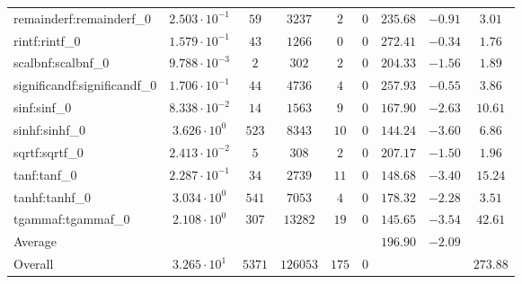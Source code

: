 \begin{tabular}{|l|c|c|c|c|c|c|c|c|}
remainderf:remainderf\_0     & $ 2.503 \cdot 10^{-1} $ & $ 59     $ & $ 3237   $ & $ 2   $ & $ 0   $ & $ 235.68      $ & $ -0.91   $ & $ 3.01    $ \\
rintf:rintf\_0               & $ 1.579 \cdot 10^{-1} $ & $ 43     $ & $ 1266   $ & $ 0   $ & $ 0   $ & $ 272.41      $ & $ -0.34   $ & $ 1.76    $ \\
scalbnf:scalbnf\_0           & $ 9.788 \cdot 10^{-3} $ & $ 2      $ & $ 302    $ & $ 2   $ & $ 0   $ & $ 204.33      $ & $ -1.56   $ & $ 1.89    $ \\
significandf:significandf\_0 & $ 1.706 \cdot 10^{-1} $ & $ 44     $ & $ 4736   $ & $ 4   $ & $ 0   $ & $ 257.93      $ & $ -0.55   $ & $ 3.86    $ \\
sinf:sinf\_0                 & $ 8.338 \cdot 10^{-2} $ & $ 14     $ & $ 1563   $ & $ 9   $ & $ 0   $ & $ 167.90      $ & $ -2.63   $ & $ 10.61   $ \\
sinhf:sinhf\_0               & $ 3.626 \cdot 10^{0}  $ & $ 523    $ & $ 8343   $ & $ 10  $ & $ 0   $ & $ 144.24      $ & $ -3.60   $ & $ 6.86    $ \\
sqrtf:sqrtf\_0               & $ 2.413 \cdot 10^{-2} $ & $ 5      $ & $ 308    $ & $ 2   $ & $ 0   $ & $ 207.17      $ & $ -1.50   $ & $ 1.96    $ \\
tanf:tanf\_0                 & $ 2.287 \cdot 10^{-1} $ & $ 34     $ & $ 2739   $ & $ 11  $ & $ 0   $ & $ 148.68      $ & $ -3.40   $ & $ 15.24   $ \\
tanhf:tanhf\_0               & $ 3.034 \cdot 10^{0}  $ & $ 541    $ & $ 7053   $ & $ 4   $ & $ 0   $ & $ 178.32      $ & $ -2.28   $ & $ 3.51    $ \\
tgammaf:tgammaf\_0           & $ 2.108 \cdot 10^{0}  $ & $ 307    $ & $ 13282  $ & $ 19  $ & $ 0   $ & $ 145.65      $ & $ -3.54   $ & $ 42.61   $ \\
\hline
Average                      & $                     $ & $        $ & $        $ & $     $ & $     $ & $ 196.90      $ & $ -2.09   $ & $         $ \\
\hline
Overall                      & $ 3.265 \cdot 10^{1}  $ & $ 5371   $ & $ 126053 $ & $ 175 $ & $ 0   $ & $             $ & $         $ & $ 273.88  $ \\
\hline
\end{tabular}
